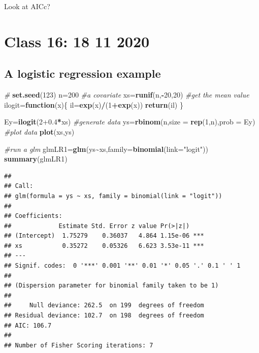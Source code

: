 \documentclass[
]{book}
\newenvironment{Shaded}{\begin{snugshade}}{\end{snugshade}}
\newcommand{\AttributeTok}[1]{\textcolor[rgb]{0.13,0.29,0.53}{#1}}
\newcommand{\CommentTok}[1]{\textcolor[rgb]{0.56,0.35,0.01}{\textit{#1}}}
\newcommand{\ControlFlowTok}[1]{\textcolor[rgb]{0.13,0.29,0.53}{\textbf{#1}}}
\newcommand{\DecValTok}[1]{\textcolor[rgb]{0.00,0.00,0.81}{#1}}
\newcommand{\FloatTok}[1]{\textcolor[rgb]{0.00,0.00,0.81}{#1}}
\newcommand{\FunctionTok}[1]{\textcolor[rgb]{0.13,0.29,0.53}{\textbf{#1}}}
\newcommand{\NormalTok}[1]{#1}
\newcommand{\OtherTok}[1]{\textcolor[rgb]{0.56,0.35,0.01}{#1}}
\newcommand{\SpecialCharTok}[1]{\textcolor[rgb]{0.81,0.36,0.00}{\textbf{#1}}}
\newcommand{\StringTok}[1]{\textcolor[rgb]{0.31,0.60,0.02}{#1}}
\begin{document}
Look at AICc?

\chapter{Class 16: 18 11 2020}\label{aula16}

\section{A logistic regression example}\label{a-logistic-regression-example}

\begin{Shaded}
\begin{Highlighting}[]
\CommentTok{\#}
\FunctionTok{set.seed}\NormalTok{(}\DecValTok{123}\NormalTok{)}
\NormalTok{n}\OtherTok{=}\DecValTok{200}
\CommentTok{\#a covariate}
\NormalTok{xs}\OtherTok{=}\FunctionTok{runif}\NormalTok{(n,}\SpecialCharTok{{-}}\DecValTok{20}\NormalTok{,}\DecValTok{20}\NormalTok{)}
\CommentTok{\#get the mean value}
\NormalTok{ilogit}\OtherTok{=}\ControlFlowTok{function}\NormalTok{(x)\{}
\NormalTok{  il}\OtherTok{=}\FunctionTok{exp}\NormalTok{(x)}\SpecialCharTok{/}\NormalTok{(}\DecValTok{1}\SpecialCharTok{+}\FunctionTok{exp}\NormalTok{(x))}
\FunctionTok{return}\NormalTok{(il)}
\NormalTok{\}}

\NormalTok{Ey}\OtherTok{=}\FunctionTok{ilogit}\NormalTok{(}\DecValTok{2}\FloatTok{+0.4}\SpecialCharTok{*}\NormalTok{xs)}
\CommentTok{\#generate data}
\NormalTok{ys}\OtherTok{=}\FunctionTok{rbinom}\NormalTok{(n,}\AttributeTok{size =} \FunctionTok{rep}\NormalTok{(}\DecValTok{1}\NormalTok{,n),}\AttributeTok{prob =}\NormalTok{ Ey)}
\CommentTok{\#plot data}
\FunctionTok{plot}\NormalTok{(xs,ys)}


\CommentTok{\#run a glm}
\NormalTok{glmLR1}\OtherTok{=}\FunctionTok{glm}\NormalTok{(ys}\SpecialCharTok{\textasciitilde{}}\NormalTok{xs,}\AttributeTok{family=}\FunctionTok{binomial}\NormalTok{(}\AttributeTok{link=}\StringTok{"logit"}\NormalTok{))}
\FunctionTok{summary}\NormalTok{(glmLR1)}
\end{Highlighting}
\end{Shaded}

\begin{verbatim}
## 
## Call:
## glm(formula = ys ~ xs, family = binomial(link = "logit"))
## 
## Coefficients:
##             Estimate Std. Error z value Pr(>|z|)    
## (Intercept)  1.75279    0.36037   4.864 1.15e-06 ***
## xs           0.35272    0.05326   6.623 3.53e-11 ***
## ---
## Signif. codes:  0 '***' 0.001 '**' 0.01 '*' 0.05 '.' 0.1 ' ' 1
## 
## (Dispersion parameter for binomial family taken to be 1)
## 
##     Null deviance: 262.5  on 199  degrees of freedom
## Residual deviance: 102.7  on 198  degrees of freedom
## AIC: 106.7
## 
## Number of Fisher Scoring iterations: 7
\end{verbatim}
\end{document}
